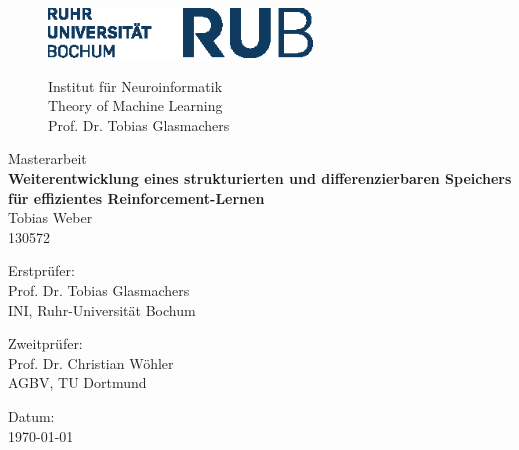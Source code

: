 \begin{titlepage}

\begin{figure}[ht]
\begin{center}
	\begin{minipage}[c]{7.5cm}
		\includegraphics[width=7cm]{abbildungen/Logo_RUB_blau_rgb.eps}
	\end{minipage}
	\qquad
		\begin{minipage}[c]{6.5cm}
		\begin{flushright}
		\vspace*{0.50cm}
		\small{
		Institut für Neuroinformatik\\
		Theory of Machine Learning\\
		Prof. Dr. Tobias Glasmachers}
		\end{flushright}
	\end{minipage}
\end{center}
\end{figure}
\vspace*{1.5cm}
\begin{center}
\Large Masterarbeit\\ %
\vspace*{1.0cm}
\huge \textbf{Weiterentwicklung eines strukturierten und differenzierbaren Speichers für effizientes Reinforcement-Lernen}\\		%
\vspace*{1.0cm}
\Large Tobias Weber\\
\Large 130572%
\vspace*{1.5cm}

Erstprüfer:\\
Prof. Dr. Tobias Glasmachers\\
INI, Ruhr-Universität Bochum\par\bigskip							%
Zweitprüfer:\\
Prof. Dr. Christian Wöhler\\
AGBV, TU Dortmund


\vspace*{1.5cm}
Datum:\\
 \today	\\
\end{center}
\end{titlepage}
